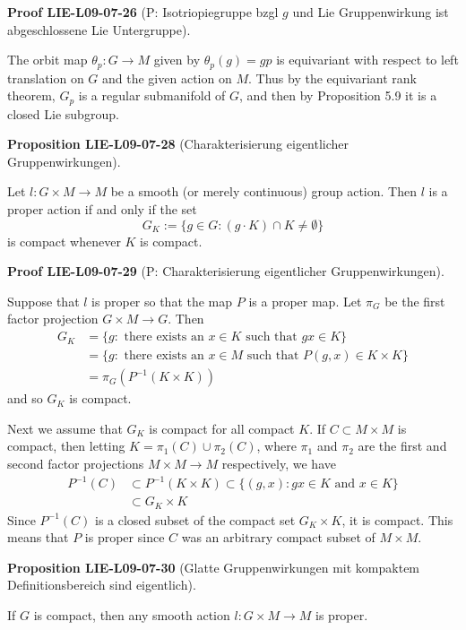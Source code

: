 \documentclass[10pt, letterpaper]{article}
\newcommand{\CustomHeading}[3]{%
  \par\medskip\noindent%
  \textbf{#1 #2} \textnormal{(#3)}.\enskip%
}
\newenvironment{PROP}[2]{\CustomHeading{Proposition}{#1}{#2}}{}
\newenvironment{PROOF}[2]{\CustomHeading{Proof}{#1}{#2}}{}
\begin{document}
\begin{PROOF}{LIE-L09-07-26}{P: Isotriopiegruppe bzgl $g$ und Lie Gruppenwirkung ist abgeschlossene Lie Untergruppe}
The orbit map $\theta_{p}: G \rightarrow M$ given by $\theta_{p}(g)=g p$ is equivariant with respect to left translation on $G$ and the given action on $M$. Thus by the equivariant rank theorem, $G_{p}$ is a regular submanifold of $G$, and then by Proposition 5.9 it is a closed Lie subgroup.
\end{PROOF}

\begin{PROP}{LIE-L09-07-28}{Charakterisierung eigentlicher Gruppenwirkungen}
Let $l: G \times M \rightarrow M$ be a smooth (or merely continuous) group action. Then $l$ is a proper action if and only if the set
$$
G_{K}:=\{g \in G:(g \cdot K) \cap K \neq \emptyset\}
$$
is compact whenever $K$ is compact.
\end{PROP}

\begin{PROOF}{LIE-L09-07-29}{P: Charakterisierung eigentlicher Gruppenwirkungen}
Suppose that $l$ is proper so that the map $P$ is a proper map. Let $\pi_{G}$ be the first factor projection $G \times M \rightarrow G$. Then
$$
\begin{aligned}
G_{K} & =\{g: \text { there exists an } x \in K \text { such that } g x \in K\} \\
& =\{g: \text { there exists an } x \in M \text { such that } P(g, x) \in K \times K\} \\
& =\pi_{G}\left(P^{-1}(K \times K)\right)
\end{aligned}
$$
and so $G_{K}$ is compact.

Next we assume that $G_{K}$ is compact for all compact $K$. If $C \subset M \times M$ is compact, then letting $K=\pi_{1}(C) \cup \pi_{2}(C)$, where $\pi_{1}$ and $\pi_{2}$ are the first and second factor projections $M \times M \rightarrow M$ respectively, we have
$$
\begin{aligned}
P^{-1}(C) & \subset P^{-1}(K \times K) \subset\{(g, x): g x \in K \text { and } x \in K\} \\
& \subset G_{K} \times K
\end{aligned}
$$
Since $P^{-1}(C)$ is a closed subset of the compact set $G_{K} \times K$, it is compact. This means that $P$ is proper since $C$ was an arbitrary compact subset of $M \times M$.
\end{PROOF}

\begin{PROP}{LIE-L09-07-30}{Glatte Gruppenwirkungen mit kompaktem Definitionsbereich sind eigentlich}
If $G$ is compact, then any smooth action $l: G \times M \rightarrow M$ is proper.
\end{PROP}
\end{document}

